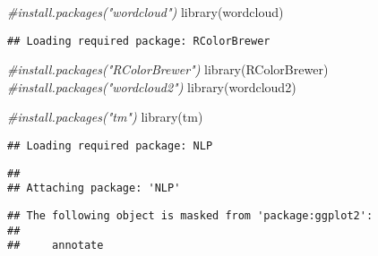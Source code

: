 \documentclass[
]{article}
\newenvironment{Shaded}{\begin{snugshade}}{\end{snugshade}}
\newcommand{\CommentTok}[1]{\textcolor[rgb]{0.56,0.35,0.01}{\textit{#1}}}
\newcommand{\FunctionTok}[1]{\textcolor[rgb]{0.00,0.00,0.00}{#1}}
\newcommand{\NormalTok}[1]{#1}
\newcommand{\OtherTok}[1]{\textcolor[rgb]{0.56,0.35,0.01}{#1}}
\newcommand{\SpecialCharTok}[1]{\textcolor[rgb]{0.00,0.00,0.00}{#1}}
\newcommand{\StringTok}[1]{\textcolor[rgb]{0.31,0.60,0.02}{#1}}
\begin{document}
\begin{Shaded}
\begin{Highlighting}[]
\CommentTok{\#install.packages("wordcloud")}
\FunctionTok{library}\NormalTok{(wordcloud)}
\end{Highlighting}
\end{Shaded}

\begin{verbatim}
## Loading required package: RColorBrewer
\end{verbatim}

\begin{Shaded}
\begin{Highlighting}[]
\CommentTok{\#install.packages("RColorBrewer")}
\FunctionTok{library}\NormalTok{(RColorBrewer)}
\CommentTok{\#install.packages("wordcloud2")}
\FunctionTok{library}\NormalTok{(wordcloud2)}

\CommentTok{\#install.packages("tm")}
\FunctionTok{library}\NormalTok{(tm)}
\end{Highlighting}
\end{Shaded}

\begin{verbatim}
## Loading required package: NLP
\end{verbatim}

\begin{verbatim}
## 
## Attaching package: 'NLP'
\end{verbatim}

\begin{verbatim}
## The following object is masked from 'package:ggplot2':
## 
##     annotate
\end{verbatim}

\begin{Shaded}
\end{Shaded}
\end{document}
